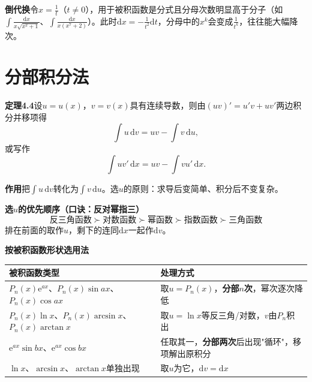 \noindent\textbf{倒代换}\quad 令$x=\frac{1}{t}$（$t\neq0$），用于被积函数是分式且分母次数明显高于分子（如$\int\frac{\mathrm{d}x}{x\sqrt{x^2+1}}$、$\int\frac{\mathrm{d}x}{x(x^7+2)}$）。此时$\mathrm{d}x=-\frac{1}{t^2}\mathrm{d}t$，分母中的$x^k$会变成$\frac{1}{t^k}$，往往能大幅降次。


\section{分部积分法}

\noindent\textbf{定理4.4}\quad 设$u=u(x)$，$v=v(x)$具有连续导数，则由$(uv)'=u'v+uv'$两边积分并移项得
\[
\int u\,\mathrm{d}v=uv-\int v\,\mathrm{d}u,
\]
或写作
\[
\int uv'\,\mathrm{d}x=uv-\int vu'\,\mathrm{d}x .
\]


\noindent\textbf{作用}\quad 把$\int u\,\mathrm{d}v$转化为$\int v\,\mathrm{d}u$。选$u$的原则：求导后变简单、积分后不变复杂。

\noindent\textbf{选$u$的优先顺序（口诀：反对幂指三）}
\[
\text{反三角函数} \succ \text{对数函数} \succ \text{幂函数} \succ \text{指数函数} \succ \text{三角函数}
\]
排在前面的取作$u$，剩下的连同$\mathrm{d}x$一起作$\mathrm{d}v$。

\noindent\textbf{按被积函数形状选用法}
\begin{center}
\begin{tabular}{@{}ll@{}}
\toprule
被积函数类型 & 处理方式 \\
\midrule
$P_n(x)\mathrm{e}^{ax}$、$P_n(x)\sin ax$、$P_n(x)\cos ax$ & 取$u=P_n(x)$，\textbf{分部$n$次}，幂次逐次降低 \\
$P_n(x)\ln x$、$P_n(x)\arcsin x$、$P_n(x)\arctan x$ & 取$u=\ln x$等反三角/对数，$v$由$P_n$积出 \\
$\mathrm{e}^{ax}\sin bx$、$\mathrm{e}^{ax}\cos bx$ & 任取其一，\textbf{分部两次}后出现"循环"，移项解出原积分 \\
$\ln x$、$\arcsin x$、$\arctan x$单独出现 & 取$u$为它，$\mathrm{d}v=\mathrm{d}x$ \\
\bottomrule
\end{tabular}
\end{center}

